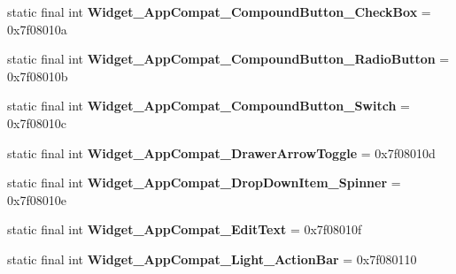 \begin{DoxyCompactItemize}
\item 
\hypertarget{classandroid_1_1support_1_1design_1_1_r_1_1style_a3ea8e6eb9033a7701d539035be6c7f9a}{}static final int {\bfseries Widget\+\_\+\+App\+Compat\+\_\+\+Compound\+Button\+\_\+\+Check\+Box} = 0x7f08010a\label{classandroid_1_1support_1_1design_1_1_r_1_1style_a3ea8e6eb9033a7701d539035be6c7f9a}

\item 
\hypertarget{classandroid_1_1support_1_1design_1_1_r_1_1style_abad9a39b0d877fc07bdd7f7823a25796}{}static final int {\bfseries Widget\+\_\+\+App\+Compat\+\_\+\+Compound\+Button\+\_\+\+Radio\+Button} = 0x7f08010b\label{classandroid_1_1support_1_1design_1_1_r_1_1style_abad9a39b0d877fc07bdd7f7823a25796}

\item 
\hypertarget{classandroid_1_1support_1_1design_1_1_r_1_1style_a6d4a76cafe643b9126d663dae6395ae0}{}static final int {\bfseries Widget\+\_\+\+App\+Compat\+\_\+\+Compound\+Button\+\_\+\+Switch} = 0x7f08010c\label{classandroid_1_1support_1_1design_1_1_r_1_1style_a6d4a76cafe643b9126d663dae6395ae0}

\item 
\hypertarget{classandroid_1_1support_1_1design_1_1_r_1_1style_ace6cb78b063c9c92ae071d282010bb37}{}static final int {\bfseries Widget\+\_\+\+App\+Compat\+\_\+\+Drawer\+Arrow\+Toggle} = 0x7f08010d\label{classandroid_1_1support_1_1design_1_1_r_1_1style_ace6cb78b063c9c92ae071d282010bb37}

\item 
\hypertarget{classandroid_1_1support_1_1design_1_1_r_1_1style_a875e226c161599fb44f162ca86831ab9}{}static final int {\bfseries Widget\+\_\+\+App\+Compat\+\_\+\+Drop\+Down\+Item\+\_\+\+Spinner} = 0x7f08010e\label{classandroid_1_1support_1_1design_1_1_r_1_1style_a875e226c161599fb44f162ca86831ab9}

\item 
\hypertarget{classandroid_1_1support_1_1design_1_1_r_1_1style_aa14bb02b82d02a1100e32ae372882cab}{}static final int {\bfseries Widget\+\_\+\+App\+Compat\+\_\+\+Edit\+Text} = 0x7f08010f\label{classandroid_1_1support_1_1design_1_1_r_1_1style_aa14bb02b82d02a1100e32ae372882cab}

\item 
\hypertarget{classandroid_1_1support_1_1design_1_1_r_1_1style_a931e5804532cff8dfa368268461dff2d}{}static final int {\bfseries Widget\+\_\+\+App\+Compat\+\_\+\+Light\+\_\+\+Action\+Bar} = 0x7f080110\label{classandroid_1_1support_1_1design_1_1_r_1_1style_a931e5804532cff8dfa368268461dff2d}


\end{DoxyCompactItemize}
